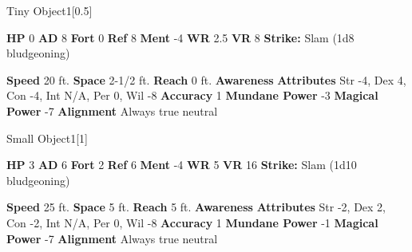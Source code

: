       
  \begin{monsubsection}{Tiny Object}{1}[0.5]
    \vspace{-1em}\vspace{-1em}
    \vspace{0em}

    
    

    \begin{spellcontent}
      \begin{spelltargetinginfo}
        \pari \textbf{HP} 0 \monsep
          \textbf{AD} 8 \monsep
          \textbf{Fort} 0 \monsep
          \textbf{Ref} 8 \monsep
          \textbf{Ment} -4
        \pari \textbf{WR} 2.5 \monsep
        \textbf{VR} 8
        \pari \textbf{Strike:}
            Slam  (1d8 bludgeoning)
      \end{spelltargetinginfo}
    \end{spellcontent}
    \begin{monsterfooter}
      \pari \textbf{Speed} 20 ft. \monsep
        \textbf{Space} 2-1/2 ft. \monsep
        \textbf{Reach} 0 ft.
      \pari \textbf{Awareness} 
      \pari \textbf{Attributes}
        Str -4, Dex 4,
        Con -4, Int N/A,
        Per 0, Wil -8
      \pari \textbf{Accuracy} 1 \monsep
        \textbf{Mundane Power} -3 \monsep
      \textbf{Magical Power} -7
      \pari \textbf{Alignment} Always true neutral
    \end{monsterfooter}
  \end{monsubsection}
  
  

  \begin{monsubsection}{Small Object}{1}[1]
    \vspace{-1em}\vspace{-1em}
    \vspace{0em}

    
    

    \begin{spellcontent}
      \begin{spelltargetinginfo}
        \pari \textbf{HP} 3 \monsep
          \textbf{AD} 6 \monsep
          \textbf{Fort} 2 \monsep
          \textbf{Ref} 6 \monsep
          \textbf{Ment} -4
        \pari \textbf{WR} 5 \monsep
        \textbf{VR} 16
        \pari \textbf{Strike:}
            Slam  (1d10 bludgeoning)
      \end{spelltargetinginfo}
    \end{spellcontent}
    \begin{monsterfooter}
      \pari \textbf{Speed} 25 ft. \monsep
        \textbf{Space} 5 ft. \monsep
        \textbf{Reach} 5 ft.
      \pari \textbf{Awareness} 
      \pari \textbf{Attributes}
        Str -2, Dex 2,
        Con -2, Int N/A,
        Per 0, Wil -8
      \pari \textbf{Accuracy} 1 \monsep
        \textbf{Mundane Power} -1 \monsep
      \textbf{Magical Power} -7
      \pari \textbf{Alignment} Always true neutral
    \end{monsterfooter}
  \end{monsubsection}
  
